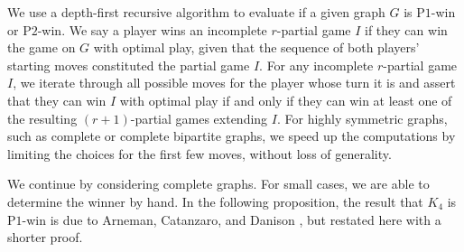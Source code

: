 \documentclass{article}
\theoremstyle{plain}
\theoremstyle{definition}
\def\pone{{\rm{P}\ensuremath{1}}}
\def\ptwo{{\rm{P}\ensuremath{2}}}
\begin{document}
We use a depth-first recursive algorithm to evaluate if a given graph $G$ is \pone{}-win or \ptwo{}-win. We say a player wins an incomplete $r$-partial game $I$ if they can win the game on $G$ with optimal play, given that the sequence of both players' starting moves constituted the partial game $I$. For any incomplete $r$-partial game $I$, we iterate through all possible moves for the player whose turn it is and assert that they can win $I$ with optimal play if and only if they can win at least one of the resulting $(r+1)$-partial games extending $I$. 
For highly symmetric graphs, such as complete or complete bipartite graphs, we speed up the computations by limiting the choices for the first few moves, without loss of generality.

We continue by considering complete graphs. For small cases, we are able to determine the winner by hand. In the following proposition, the result that $K_4$ is \pone{}-win is due to Arneman, Catanzaro, and Danison \cite{ArCaDa21}, but restated here with a shorter proof. 
\end{document}
